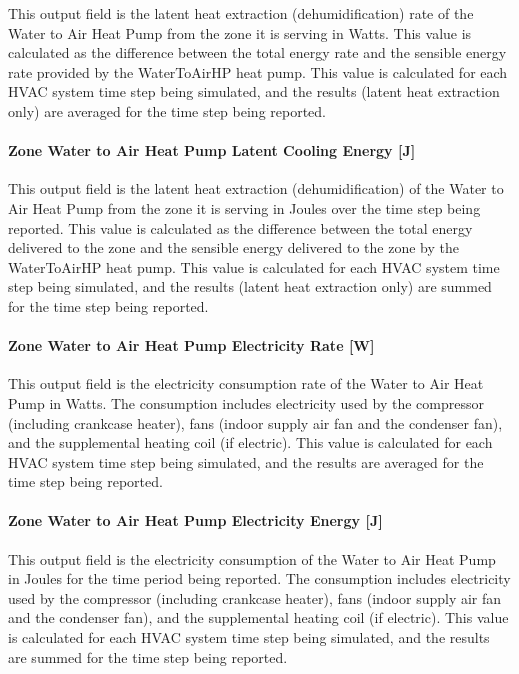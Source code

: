 This output field is the latent heat extraction (dehumidification) rate of the Water to Air Heat Pump from the zone it is serving in Watts. This value is calculated as the difference between the total energy rate and the sensible energy rate provided by the WaterToAirHP heat pump. This value is calculated for each HVAC system time step being simulated, and the results (latent heat extraction only) are averaged for the time step being reported.

\paragraph{Zone Water to Air Heat Pump Latent Cooling Energy {[}J{]}}\label{zone-water-to-air-heat-pump-latent-cooling-energy-j}

This output field is the latent heat extraction (dehumidification) of the Water to Air Heat Pump from the zone it is serving in Joules over the time step being reported. This value is calculated as the difference between the total energy delivered to the zone and the sensible energy delivered to the zone by the WaterToAirHP heat pump. This value is calculated for each HVAC system time step being simulated, and the results (latent heat extraction only) are summed for the time step being reported.

\paragraph{Zone Water to Air Heat Pump Electricity Rate {[}W{]}}\label{zone-water-to-air-heat-pump-electric-power-w}

This output field is the electricity consumption rate of the Water to Air Heat Pump in Watts. The consumption includes electricity used by the compressor (including crankcase heater), fans (indoor supply air fan and the condenser fan), and the supplemental heating coil (if electric). This value is calculated for each HVAC system time step being simulated, and the results are averaged for the time step being reported.

\paragraph{Zone Water to Air Heat Pump Electricity Energy {[}J{]}}\label{zone-water-to-air-heat-pump-electric-energy-j}

This output field is the electricity consumption of the Water to Air Heat Pump in Joules for the time period being reported. The consumption includes electricity used by the compressor (including crankcase heater), fans (indoor supply air fan and the condenser fan), and the supplemental heating coil (if electric). This value is calculated for each HVAC system time step being simulated, and the results are summed for the time step being reported.

